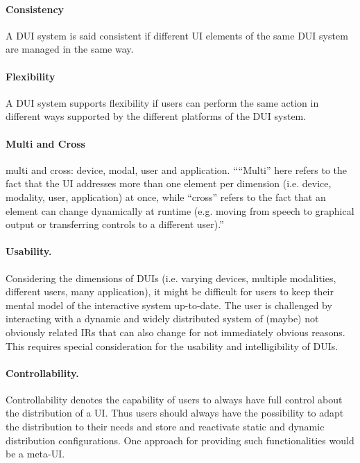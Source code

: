 \paragraph{Consistency}\cite{lopez2011formal}A DUI system is said consistent if
different UI elements of the same DUI system are managed in the same way.\\

\paragraph{Flexibility}\cite{lopez2011formal}A DUI system supports flexibility
if users can perform the same action in different ways supported by the different platforms
of the DUI system.\\


 \paragraph{Multi and Cross} \cite{blumendorf2011distributed} multi and cross:
device, modal, user and application. ``“Multi” here refers to the fact that the
UI addresses more than one element per dimension (i.e. device, modality, user,
application) at once, while “cross” refers to the fact that an element can
change dynamically at runtime (e.g. moving from speech to graphical output or
transferring controls to a different user).''\\


\paragraph{Usability.}
\cite{blumendorf2011distributed}Considering the dimensions of DUIs (i.e. varying
devices, multiple modalities, different users, many application), it might be
difficult for users to keep their mental model of the interactive system up-to-date. The user is challenged by interacting with a dynamic and widely distributed system of (maybe) not obviously related IRs that can also change for not immediately obvious reasons. This requires special consideration for the usability and intelligibility of DUIs.\\

\paragraph{Controllability.} 
\cite{blumendorf2011distributed}Controllability denotes the capability of users
to always have full control about the distribution of a UI. Thus users should
always have the possibility to adapt the distribution to their needs and store
and reactivate static and dynamic distribution configurations. One approach for
providing such functionalities would be a meta-UI.\\


